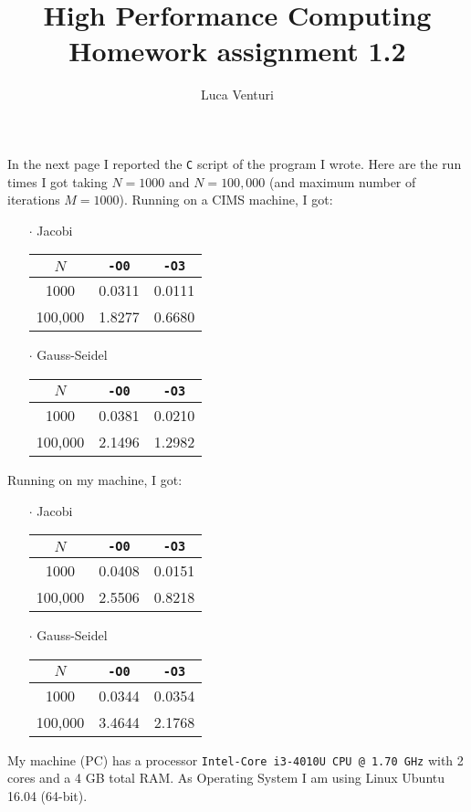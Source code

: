 \documentclass[a4paper,11pt]{article}
\theoremstyle{definition}
\theoremstyle{plain}
\theoremstyle{remark}
\begin{document}
\title{High Performance Computing \\ Homework assignment 1.2}
\author{Luca Venturi}
\maketitle

In the next page I reported the \texttt{C} script of the program I wrote. Here are the run times I got taking $N=1000$ and $N=100,000$ (and maximum number of iterations $M=1000$). Running on a CIMS machine, I got:
\begin{enumerate}
\item[$\cdot$] Jacobi
\begin{center}
  \begin{tabular}{ | c | c | c | }
    \hline
    $N$ & \texttt{-O0} & \texttt{-O3} \\ \hline
    1000 & 0.0311 & 0.0111 \\ \hline
    100,000 & 1.8277 & 0.6680 \\ \hline
  \end{tabular}
\end{center}
\item[$\cdot$] Gauss-Seidel
\begin{center}
  \begin{tabular}{ | c | c | c | }
    \hline
    $N$ & \texttt{-O0} & \texttt{-O3} \\ \hline
    1000 & 0.0381 & 0.0210 \\ \hline
    100,000 & 2.1496 & 1.2982 \\ \hline
  \end{tabular}
\end{center}
\end{enumerate}
Running on my machine, I got:
\begin{enumerate}
\item[$\cdot$] Jacobi
\begin{center}
  \begin{tabular}{ | c | c | c | }
    \hline
    $N$ & \texttt{-O0} & \texttt{-O3} \\ \hline
    1000 & 0.0408 & 0.0151 \\ \hline
    100,000 & 2.5506 & 0.8218 \\ \hline
  \end{tabular}
\end{center}
\item[$\cdot$] Gauss-Seidel
\begin{center}
  \begin{tabular}{ | c | c | c | }
    \hline
    $N$ & \texttt{-O0} & \texttt{-O3} \\ \hline
    1000 & 0.0344 & 0.0354 \\ \hline
    100,000 & 3.4644 & 2.1768 \\ \hline
  \end{tabular}
\end{center}
\end{enumerate}
My machine (PC) has a processor \texttt{Intel-Core i3-4010U CPU @ 1.70 GHz} with 2 cores and a 4 GB total RAM. As Operating System I am using Linux Ubuntu 16.04 (64-bit).
\end{document}
